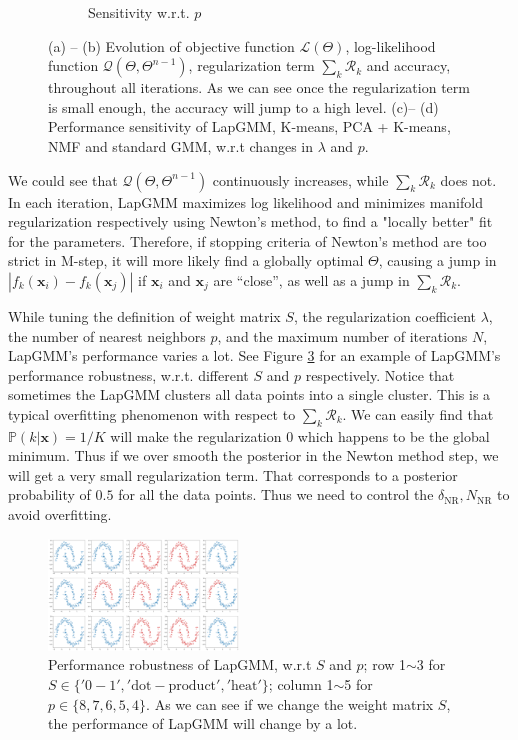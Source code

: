 \documentclass[10pt,journal,compsoc]{IEEEtran}
\newcommand{\Prob}{\mathbb{P}}
\newcommand{\x}{\mathbf{x}}
\begin{document}
\begin{figure}[!t]
\begin{subfigure}{.23\textwidth}
            \caption{Sensitivity w.r.t. $p$}
            \label{fig:p}
        \end{subfigure}
        \caption{(a) -- (b) Evolution of objective function $\mathcal{L}(\Theta)$, log-likelihood function $\mathcal{Q}(\Theta, \Theta^{n-1})$, regularization term $\sum_{k}\mathcal{R}_k$ and accuracy, throughout all iterations. As we can see once the regularization term is small enough, the accuracy will jump to a high level. (c)-- (d) Performance sensitivity of LapGMM, K-means, PCA + K-means, NMF and standard GMM, w.r.t changes in $\lambda$ and $p$.}
    \end{figure}

    We could see that $\mathcal{Q}(\Theta, \Theta^{n-1})$ continuously increases, while $\sum_{k}\mathcal{R}_k$ does not. In each iteration, LapGMM maximizes log likelihood and minimizes manifold regularization respectively using Newton's method, to find a "locally better" fit for the parameters. Therefore, if stopping criteria of Newton’s method are too strict in M-step, it will more likely find a globally optimal $\Theta$, causing a jump in $|f_k(\x_i) - f_k(\x_j)|$ if $\x_i$ and $\x_j$ are “close”, as well as a jump in $\sum_{k}\mathcal{R}_k$.
    
    While tuning the definition of weight matrix $S$, the regularization coefficient $\lambda$, the number of nearest neighbors $p$, and the maximum number of iterations $N$, LapGMM’s performance varies a lot. See Figure \ref{fig:S-p} for an example of LapGMM’s performance robustness, w.r.t. different $S$ and $p$ respectively. Notice that sometimes the LapGMM clusters all data points into a single cluster. This is a typical overfitting phenomenon with respect to $\sum_k \mathcal{R}_k$. We can easily find that $\Prob(k | \x) = 1/K$ will make the regularization $0$ which happens to be the global minimum. Thus if we over smooth the posterior in the Newton method step, we will get a very small regularization term. That corresponds to a posterior probability of $0.5$ for all the data points. Thus we need to control the $\delta_{\mathrm{NR}}, N_{\mathrm{NR}}$ to avoid overfitting.
    
    \begin{figure}[t]
        \centering
        \includegraphics[width=0.45\textwidth]{figures/LapGMMrobustnessSp.png}
        \caption{Performance robustness of LapGMM, w.r.t $S$ and $p$; row 1$\sim$3 for $S\in\{\mathrm{'0-1'},\mathrm{'dot-product'},\mathrm{'heat'}\}$; column 1$\sim$5 for $p\in\{8,7,6,5,4\}$. As we can see if we change the weight matrix $S$, the performance of LapGMM will change by a lot.}
        \label{fig:S-p}
    \end{figure}
    
\end{document}

